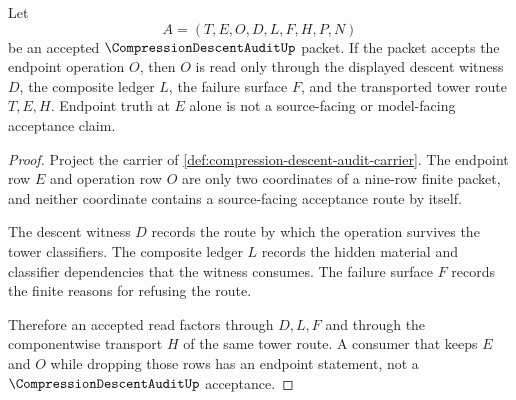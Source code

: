 \begin{theorem}
\label{thm:compression-descent-audit-route-soundness}
Let
$$
A=(T,E,O,D,L,F,H,P,N)
$$
be an accepted $\CompressionDescentAuditUp$ packet. If the packet accepts the endpoint operation $O$, then $O$ is read only through the displayed descent witness $D$, the composite ledger $L$, the failure surface $F$, and the transported tower route $T,E,H$. Endpoint truth at $E$ alone is not a source-facing or model-facing acceptance claim.
\end{theorem}
\begin{proof}
Project the carrier of \autoref{def:compression-descent-audit-carrier}. The endpoint row $E$ and operation row $O$ are only two coordinates of a nine-row finite packet, and neither coordinate contains a source-facing acceptance route by itself.

The descent witness $D$ records the route by which the operation survives the tower classifiers. The composite ledger $L$ records the hidden material and classifier dependencies that the witness consumes. The failure surface $F$ records the finite reasons for refusing the route.

Therefore an accepted read factors through $D,L,F$ and through the componentwise transport $H$ of the same tower route. A consumer that keeps $E$ and $O$ while dropping those rows has an endpoint statement, not a $\CompressionDescentAuditUp$ acceptance.
\end{proof}

